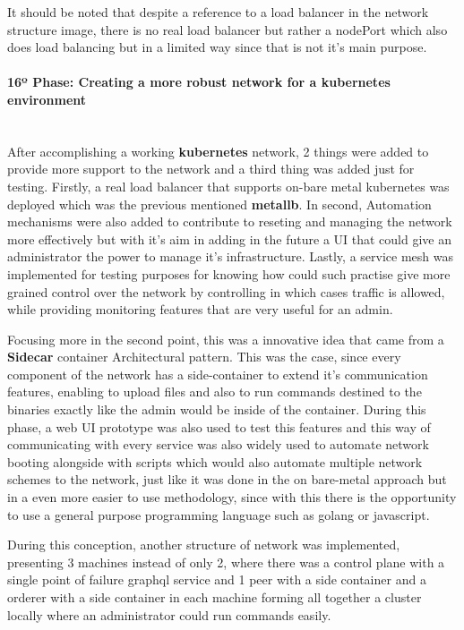 It should be noted that despite a reference to a load balancer in the network structure image, there is no real load balancer but rather a nodePort which also does load balancing but in a limited way since that is not it's main purpose.

\paragraph{16º Phase: Creating a more robust network for a kubernetes environment}\mbox{}\\
After accomplishing a working \textbf{kubernetes} network, 2 things were added to provide more support to the network and a third thing was added just for testing. Firstly, a real load balancer that supports on-bare metal kubernetes was deployed which was the previous mentioned \textbf{metallb}. In second, Automation mechanisms were also added to contribute to reseting and managing the network more effectively but with it's aim in adding in the future a UI that could give an administrator the power to manage it's infrastructure. Lastly, a service mesh was implemented for testing purposes for knowing how could such practise give more grained control over the network by controlling in which cases traffic is allowed, while providing monitoring features that are very useful for an admin.

Focusing more in the second point, this was a innovative idea that came from a \textbf{Sidecar} container Architectural pattern. This was the case, since every component of the network has a side-container to extend it's communication features, enabling to upload files and also to run commands destined to the binaries exactly like the admin would be inside of the container. During this phase, a web UI prototype was also used to test this features and this way of communicating with every service was also widely used to automate network booting alongside with scripts which would also automate multiple network schemes to the network, just like it was done in the on bare-metal approach but in a even more easier to use methodology, since with this there is the opportunity to use a general purpose programming language such as golang or javascript. 

During this conception, another structure of network was implemented, presenting 3 machines instead of only 2, where there was a control plane with a single point of failure graphql service and 1 peer with a side container and a orderer with a side container in each machine forming all together a cluster locally where an administrator could run commands easily.

